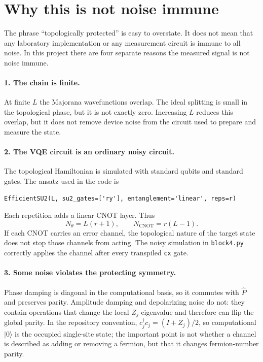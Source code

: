 \documentclass[11pt]{article}
\newcommand{\ket}[1]{|#1\rangle}
\newcommand{\Pop}{\hat{P}}
\newcommand{\cx}{\texttt{cx}}
\begin{document}
\section{Why this is not noise immune}

The phrase ``topologically protected'' is easy to overstate. It does not mean
that any laboratory implementation or any measurement circuit is immune to all
noise. In this project there are four separate reasons the measured signal is
not noise immune.

\paragraph{1. The chain is finite.}
At finite $L$ the Majorana wavefunctions overlap. The ideal splitting is small
in the topological phase, but it is not exactly zero. Increasing $L$ reduces this
overlap, but it does not remove device noise from the circuit used to prepare and
measure the state.

\paragraph{2. The VQE circuit is an ordinary noisy circuit.}
The topological Hamiltonian is simulated with standard qubits and standard gates.
The ansatz used in the code is
\begin{verbatim}
EfficientSU2(L, su2_gates=['ry'], entanglement='linear', reps=r)
\end{verbatim}
Each repetition adds a linear CNOT layer. Thus
\begin{equation}
  N_{\theta}=L(r+1),
  \qquad
  N_{\mathrm{CNOT}}=r(L-1).
\end{equation}
If each CNOT carries an error channel, the topological nature of the target state
does not stop those channels from acting. The noisy simulation in
\texttt{block4.py} correctly applies the channel after every transpiled \cx{}
gate.

\paragraph{3. Some noise violates the protecting symmetry.}
Phase damping is diagonal in the computational basis, so it commutes with
$\Pop$ and preserves parity. Amplitude damping and depolarizing noise do not:
they contain operations that change the local $Z_j$ eigenvalue and therefore can
flip the global parity. In the repository convention,
$c_j^\dagger c_j=(I+Z_j)/2$, so computational $\ket{0}$ is the occupied
single-site state; the important point is not whether a channel is described as
adding or removing a fermion, but that it changes fermion-number parity.
\end{document}

